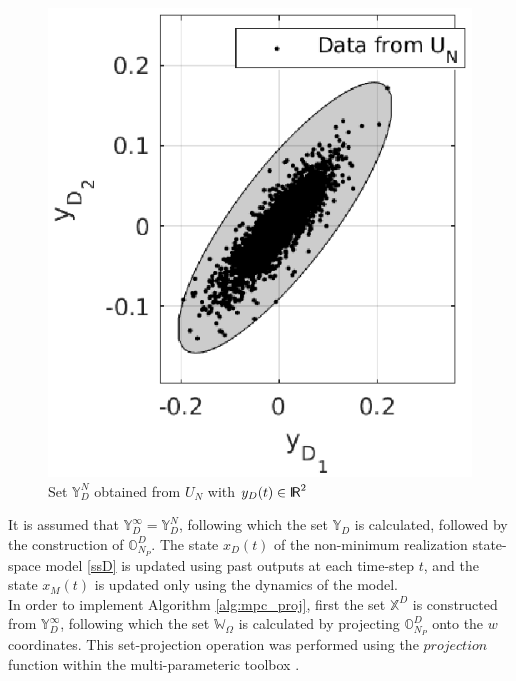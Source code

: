 \documentclass[letterpaper, 10 pt, conference]{ieeeconf}  %
\newcommand*{\RR}{%
	\textsf{I\kern-.3ex R}%
}
\begin{document}
	\begin{figure}[h]
		\hspace{30pt}
		\includegraphics[scale=0.6]{Y_D_set.eps}
		\caption{Set $\mathbb{Y}_D^N$ obtained from $U_N$ with $y_D(t) \in \RR^{2}$}
		\label{Y_D^inf}
	\end{figure} 
It is assumed that $\mathbb{Y}_D^{\infty}=\mathbb{Y}_D^N$, following which the set $\mathbb{Y}_D$ is calculated, followed by the construction of $\mathbb{O}_{N_P}^D$. The state $x_D(t)$ of the non-minimum realization state-space model \eqref{ssD} is updated using past outputs at each time-step $t$, and the state $x_M(t)$ is updated only using the dynamics of the model.
\\
\indent
In order to implement Algorithm \ref{alg:mpc_proj}, first the set $\mathbb{X}^D$ is constructed from $\mathbb{Y}_D^{\infty}$, following which the set $\mathbb{W}_{\Omega}$ is calculated by projecting $\mathbb{O}_{N_P}^D$ onto the $w$ coordinates. This set-projection operation was performed using the $projection$ function within the multi-parameteric toolbox \cite{mpt}. 
\end{document}
